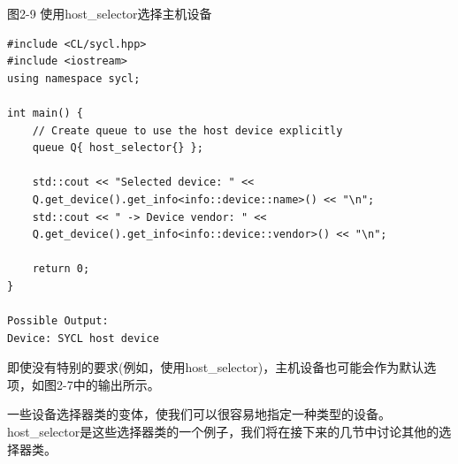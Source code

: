 \hspace*{\fill} \par %
图2-9 使用host\_selector选择主机设备
\begin{lstlisting}[caption={}]
#include <CL/sycl.hpp>
#include <iostream>
using namespace sycl;

int main() {
	// Create queue to use the host device explicitly
	queue Q{ host_selector{} };
	
	std::cout << "Selected device: " <<
	Q.get_device().get_info<info::device::name>() << "\n";
	std::cout << " -> Device vendor: " <<
	Q.get_device().get_info<info::device::vendor>() << "\n";
	
	return 0;
}

Possible Output:
Device: SYCL host device
\end{lstlisting}

即使没有特别的要求(例如，使用host\_selector)，主机设备也可能会作为默认选项，如图2-7中的输出所示。\par

一些设备选择器类的变体，使我们可以很容易地指定一种类型的设备。host\_selector是这些选择器类的一个例子，我们将在接下来的几节中讨论其他的选择器类。\par






